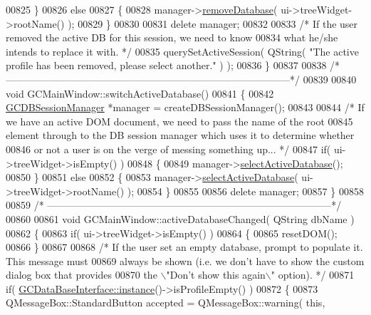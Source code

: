 \begin{DoxyCode}
{{{{00825   \}
00826   \textcolor{keywordflow}{else}
00827   \{
00828     manager->\hyperlink{class_g_c_d_b_session_manager_a0fc44e9d2efb407cc0964295920b2432}{removeDatabase}( ui->treeWidget->rootName() );
00829   \}
00830 
00831   \textcolor{keyword}{delete} manager;
00832 
00833   \textcolor{comment}{/* If the user removed the active DB for this session, we need to know}
00834 \textcolor{comment}{    what he/she intends to replace it with. */}
00835   querySetActiveSession( QString( \textcolor{stringliteral}{"The active profile has been removed, please
       select another."} ) );
00836 \}
00837 
00838 \textcolor{comment}{/*
      --------------------------------------------------------------------------------------*/}
00839 
00840 \textcolor{keywordtype}{void} GCMainWindow::switchActiveDatabase()
00841 \{
00842   \hyperlink{class_g_c_d_b_session_manager}{GCDBSessionManager} *manager = createDBSessionManager();
00843 
00844   \textcolor{comment}{/* If we have an active DOM document, we need to pass the name of the root}
00845 \textcolor{comment}{    element through to the DB session manager which uses it to determine
       whether}
00846 \textcolor{comment}{    or not a user is on the verge of messing something up... */}
00847   \textcolor{keywordflow}{if}( ui->treeWidget->isEmpty() )
00848   \{
00849     manager->\hyperlink{class_g_c_d_b_session_manager_ac4e5a25619ee77bc9307d3428bfd345d}{selectActiveDatabase}();
00850   \}
00851   \textcolor{keywordflow}{else}
00852   \{
00853     manager->\hyperlink{class_g_c_d_b_session_manager_ac4e5a25619ee77bc9307d3428bfd345d}{selectActiveDatabase}( ui->treeWidget->rootName() );
00854   \}
00855 
00856   \textcolor{keyword}{delete} manager;
00857 \}
00858 
00859 \textcolor{comment}{/*
      --------------------------------------------------------------------------------------*/}
00860 
00861 \textcolor{keywordtype}{void} GCMainWindow::activeDatabaseChanged( QString dbName )
00862 \{
00863   \textcolor{keywordflow}{if}( ui->treeWidget->isEmpty() )
00864   \{
00865     resetDOM();
00866   \}
00867 
00868   \textcolor{comment}{/* If the user set an empty database, prompt to populate it.  This message
       must}
00869 \textcolor{comment}{    always be shown (i.e. we don't have to show the custom dialog box that
       provides}
00870 \textcolor{comment}{    the \(\backslash\)"Don't show this again\(\backslash\)" option). */}
00871   \textcolor{keywordflow}{if}( \hyperlink{class_g_c_data_base_interface_a1baea9c0667aa8b610ec30076fcab84c}{GCDataBaseInterface::instance}()->isProfileEmpty() )
00872   \{
00873     QMessageBox::StandardButton accepted = QMessageBox::warning( \textcolor{keyword}{this},
}}}}
\end{DoxyCode}
